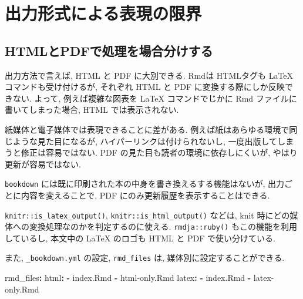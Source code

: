 \documentclass[
  xelatex,ja=standard,jafont=noto]{bxjsbook}
\newenvironment{Shaded}{\begin{snugshade}}{\end{snugshade}}
\newcommand{\AttributeTok}[1]{\textcolor[rgb]{0.77,0.63,0.00}{#1}}
\newcommand{\FunctionTok}[1]{\textcolor[rgb]{0.00,0.00,0.00}{#1}}
\newcommand{\KeywordTok}[1]{\textcolor[rgb]{0.13,0.29,0.53}{\textbf{#1}}}
\theoremstyle{definition}
\theoremstyle{definition}
\theoremstyle{definition}
\theoremstyle{definition}
\theoremstyle{remark}
\begin{document}
\hypertarget{ux51faux529bux5f62ux5f0fux306bux3088ux308bux8868ux73feux306eux9650ux754c}{%
\chapter{出力形式による表現の限界}\label{ux51faux529bux5f62ux5f0fux306bux3088ux308bux8868ux73feux306eux9650ux754c}}

\hypertarget{htmlux3068pdfux3067ux51e6ux7406ux3092ux5834ux5408ux5206ux3051ux3059ux308b}{%
\section{HTMLとPDFで処理を場合分けする}\label{htmlux3068pdfux3067ux51e6ux7406ux3092ux5834ux5408ux5206ux3051ux3059ux308b}}

出力方法で言えば, HTML と PDF に大別できる. Rmdは HTMLタグも LaTeX
コマンドも受け付けるが, それぞれ HTML と PDF
に変換する際にしか反映できない. よって, 例えば複雑な図表を LaTeX
コマンドでじかに Rmd ファイルに書いてしまった場合, HTML
では表示されない.

紙媒体と電子媒体では表現できることに差がある.
例えば紙はあらゆる環境で同じような見た目になるが,
ハイパーリンクは付けられないし, 一度出版してしまうと修正は容易ではない.
PDF の見た目も読者の環境に依存しにくいが, やはり更新が容易ではない.

\texttt{bookdown}
には既に印刷された本の中身を書き換えるする機能はないが,
出力ごとに内容を変えることで, PDF にのみ更新履歴を表示することはできる.

\texttt{knitr::is\_latex\_output()}, \texttt{knitr::is\_html\_output()}
などは, knit 時にどの媒体への変換処理なのかを判定するのに使える.
\texttt{rmdja::ruby()} もこの機能を利用しているし, 本文中の \LaTeX
のロゴも HTML と PDF で使い分けている.

また, \texttt{\_bookdown.yml} の設定, \texttt{rmd\_files} は,
媒体別に設定することができる.

\begin{Shaded}
\begin{Highlighting}[]
\FunctionTok{rmd\_files}\KeywordTok{:}
\AttributeTok{  }\FunctionTok{html}\KeywordTok{:}
\AttributeTok{    }\KeywordTok{{-}}\AttributeTok{ index.Rmd}
\AttributeTok{    }\KeywordTok{{-}}\AttributeTok{ html{-}only.Rmd}
\AttributeTok{  }\FunctionTok{latex}\KeywordTok{:}
\AttributeTok{    }\KeywordTok{{-}}\AttributeTok{ index.Rmd}
\AttributeTok{    }\KeywordTok{{-}}\AttributeTok{ latex{-}only.Rmd}
\end{Highlighting}
\end{Shaded}
\end{document}
